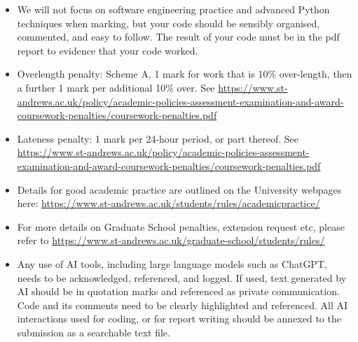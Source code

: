 \documentclass[a4paper,11pt]{article}
\begin{document}
\begin{itemize}
\item We will not focus on software engineering practice and advanced Python 
techniques when marking, but your code should be sensibly organised, commented, and easy to follow. The result of your code must be in the pdf report to evidence that your code worked.
\item Overlength penalty: Scheme A, 1 mark for work that is 10\% over-length, then a further 1 mark per additional 10\% over. See \url{https://www.st-andrews.ac.uk/policy/academic-policies-assessment-examination-and-award-coursework-penalties/coursework-penalties.pdf} 
\item
Lateness penalty: 1 mark per 24-hour period, or part thereof. See \url{https://www.st-andrews.ac.uk/policy/academic-policies-assessment-examination-and-award-coursework-penalties/coursework-penalties.pdf} 
\item
Details for good academic practice are outlined on the University webpages here:
\url{https://www.st-andrews.ac.uk/students/rules/academicpractice/}
\item For more details on Graduate School penalties, extension request etc, please refer to \url{https://www.st-andrews.ac.uk/graduate-school/students/rules/}
\item Any use of AI tools, including large language models such as ChatGPT, needs to be acknowledged, referenced, and logged.
If used, text generated by AI should be in quotation marks and referenced as private communication. Code and its comments need to be clearly highlighted and referenced. All
AI interactions used for coding, or for report writing should be annexed to the submission as a searchable text file.


\end{itemize}
\end{document}
